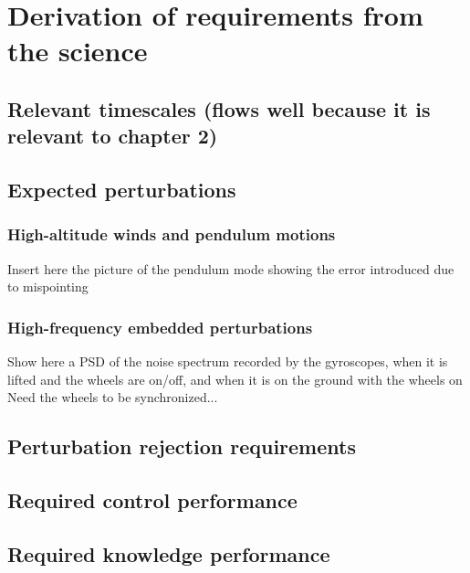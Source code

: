 \section{Derivation of requirements from the science}
\subsection{	Relevant timescales (flows well because it is relevant to chapter 2)}
\subsection{	Expected perturbations}
\subsubsection{	High-altitude winds and pendulum motions}
Insert here the picture of the pendulum mode showing the error introduced due to mispointing
\subsubsection{	High-frequency embedded perturbations}
Show here a PSD of the noise spectrum recorded by the gyroscopes, when it is lifted and the wheels are on/off, and when it is on the ground with the wheels on
Need the wheels to be synchronized...
\subsection{	Perturbation rejection requirements }
\subsection{	Required control performance}
\subsection{	Required knowledge performance}
